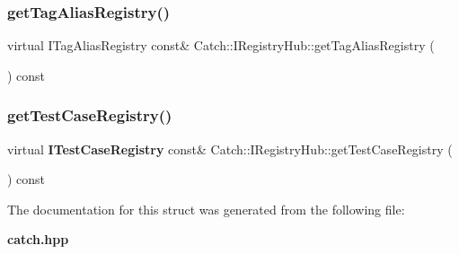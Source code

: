 \mbox{\label{struct_catch_1_1_i_registry_hub_a3c511b1d33e5a6d95c333a0ff387df1a}} 
\subsubsection{getTagAliasRegistry()}
{\footnotesize\ttfamily virtual I\+Tag\+Alias\+Registry const\& Catch\+::\+I\+Registry\+Hub\+::get\+Tag\+Alias\+Registry (\begin{DoxyParamCaption}{ }\end{DoxyParamCaption}) const\hspace{0.3cm}{\ttfamily [pure virtual]}}

\mbox{\label{struct_catch_1_1_i_registry_hub_af4f6255f0c0f8f1f179fa9d7d4843076}} 
\subsubsection{getTestCaseRegistry()}
{\footnotesize\ttfamily virtual \textbf{ I\+Test\+Case\+Registry} const\& Catch\+::\+I\+Registry\+Hub\+::get\+Test\+Case\+Registry (\begin{DoxyParamCaption}{ }\end{DoxyParamCaption}) const\hspace{0.3cm}{\ttfamily [pure virtual]}}



The documentation for this struct was generated from the following file\+:\begin{DoxyCompactItemize}
\item 
\textbf{ catch.\+hpp}\end{DoxyCompactItemize}
